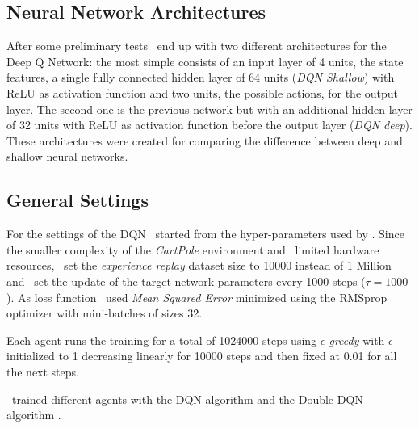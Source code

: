 \subsection{Neural Network Architectures}

After some preliminary tests \auth~end up with two different architectures for the Deep Q Network: the most simple consists of an input layer of 4 units, the state features, a single fully connected hidden layer of 64 units (\textit{DQN Shallow}) with ReLU as activation function and two units, the possible actions, for the output layer. The second one is the previous network but with an additional hidden layer of 32 units with ReLU as activation function before the output layer (\textit{DQN deep}). %
These architectures were created for comparing the difference between deep and shallow neural networks.

\subsection{General Settings}

For the settings of the DQN \auth~started from the hyper-parameters used by \citeauthor{Hasselt:2016:DRL:3016100.3016191} . Since the smaller complexity of the \textit{CartPole} environment and \authpp~limited hardware resources, \auth~set the \textit{experience replay} dataset size to 10000 instead of 1 Million and \auth~set the update of the target network parameters every 1000 steps ($\tau = 1000$). As loss function \auth~used \textit{Mean Squared Error} minimized using the RMSprop optimizer with mini-batches of sizes 32.

Each agent runs the training for a total of 1024000 steps using \textit{$\epsilon$-greedy} with $\epsilon$ initialized to 1 decreasing linearly for 10000 steps and then fixed at 0.01 for all the next steps.

\Auth~trained different agents with the DQN algorithm \cite{Mnih2015} and the Double DQN algorithm \cite{Hasselt:2016:DRL:3016100.3016191}.

